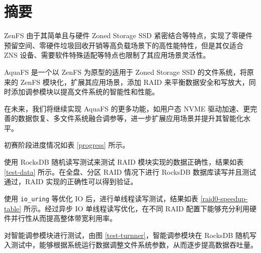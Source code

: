 \section*{摘要}

ZenFS 由于其简单且与硬件 Zoned Storage SSD 紧密结合等特点，实现了零硬件预留空间、零硬件垃圾回收开销等高负载场景下的高性能特性，但是其仅适合 ZNS 设备、需要软件特殊适配等特点也限制了其应用场景灵活性。

AquaFS 是一个以 ZenFS 为原型的适用于 Zoned Storage SSD 的文件系统，将原来的 ZenFS 模块化，扩展其应用场景，添加 RAID 来平衡数据安全和写放大，同时添加调参模块以提高文件系统的智能性和性能。

在未来，我们将继续实现 AquaFS 的更多功能，如用户态 NVME 驱动加速、更完善的数据恢复、多文件系统融合调参等，进一步扩展应用场景并提升其智能化水平。

初赛阶段进度情况如表 \ref{progress} 所示。



使用 RocksDB 随机读写测试来测试 RAID 模块实现的数据正确性，结果如表 \ref{test-data} 所示。在全盘、分区 RAID 情况下进行 RocksDB 数据库读写并且测试通过，RAID 实现的正确性可以得到验证。

使用 \verb|io_uring| 等优化 IO 后，进行单线程读写测试，结果如表 \ref{raid0-speedup-table} 所示。经过异步 IO 单线程读写优化，在不同 RAID 配置下能够充分利用硬件并行性从而提高整体带宽利用率。

对智能调参模块进行测试，由图 \ref{test-turnner}，智能调参模块在 RocksDB 随机写入测试中，能够根据系统运行数据调整文件系统参数，从而逐步提高数据吞吐量。